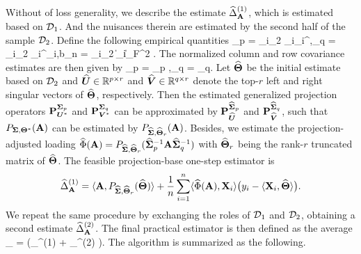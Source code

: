 \documentclass[authoryear,preprint,review,12pt]{elsarticle}
\begin{document}
	Without of loss generality, we describe the  estimate $\widehat\Delta_{\mathbf{A}}^{(1)}$, which is estimated based on $\mathcal{D}_1$. And the nuisances therein are estimated by the second half of the sample $\mathcal{D}_2$. Define the following empirical quantities
	\be\label{eq:cov}\widetilde \bSigma_p = \sum_{i\in\mD_2} \bX_i\bX_i^{\top},\quad  \widetilde\bSigma_q  = \sum_{i\in\mD_2} \bX_i^{\top}\bX_i,\quad  b_n =  \sum_{i\in\mD_2} \|\bX_i\|_F^2 .\ee
	The normalized column and row covariance estimates are then given by  
	\be\label{eq:cov2}\wh\bSigma_p = \wt \bSigma_p ,\quad \wh\bSigma_q =  \wt \bSigma_q.\ee
	Let  $\widehat{\mathbf{\Theta}}$ be the initial estimate based on $\mathcal{D}_2$ and $\widehat{\boldsymbol U} \in \mathbb{R}^{p \times r}$ and $\widehat{\boldsymbol V} \in \mathbb{R}^{q \times r}$ denote the top-$r$ left and right singular vectors of $\widehat{\mathbf{\Theta}}$, respectively. Then the estimated generalized projection operators $\mathbf{P}_{\boldsymbol U^\ast}^{\mathbf{ \Sigma}_p}$ and $\mathbf{P}_{\boldsymbol V^\ast}^{\mathbf{ \Sigma}_q}$  can be approximated by $\mathbf{P}_{\widehat{\boldsymbol U}}^{\widehat{\mathbf{ \Sigma}}_p}$ and $\mathbf{P}_{\widehat{\boldsymbol V}}^{\widehat{\mathbf{ \Sigma}}_q}$, such that $	P_{\mathbf{ \Sigma},\mathbf\Theta^\ast}(\mathbf A)$ can be estimated by $	P_{\widehat{\mathbf{ \Sigma}},\widehat{\mathbf{\Theta}}_r}(\mathbf A)$. 
	Besides, we estimate the  projection-adjusted loading  $\widehat\Phi(\mathbf{A}) =    P_{\widehat{\mathbf{ \Sigma}},\widehat{\mathbf{\Theta}}_r}(\widehat{\mathbf{ \Sigma}}_p^{-1}\mathbf{A} \widehat{\mathbf{ \Sigma}}_q^{-1})$ with $\widehat{\mathbf{\Theta}}_r$ being the rank-$r$ truncated matrix of $\widehat{\mathbf{\Theta}}$.
	The feasible projection-base one-step estimator is
	\begin{equation} 
		\widehat\Delta_{\mathbf{A}}^{(1)}
		=
		\langle \mathbf{A}, P_{\widehat{\mathbf{ \Sigma}},\widehat{\mathbf{\Theta}}_r}(\widehat{\mathbf{\Theta}})\rangle
		+
		\frac{1}{n}\sum_{i=1}^n
		\langle \widehat\Phi(\mathbf{A}),\mathbf X_i\rangle
		\bigl(y_i-\langle \mathbf X_i,\widehat{\mathbf{\Theta}}\rangle\bigr).
		\label{eq:feasible-matrix}
	\end{equation} 
	We repeat the same procedure by exchanging the roles of $\mathcal{D}_1$ and $\mathcal{D}_2$, obtaining a second estimate  $\widehat\Delta_{\mathbf{A}}^{(2)}$. The final practical estimator is then defined as the average 
	\be\label{eq:final} \wh\Delta_{\bA}  = (\wh\Delta_{\bA}^{(1)} + \wh\Delta_{\bA}^{(2)} ).\ee 
	The algorithm is summarized as the following.  
\end{document}
